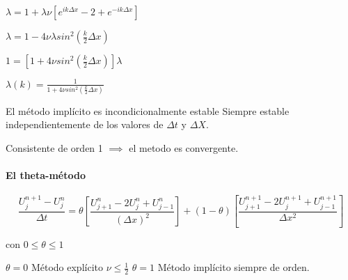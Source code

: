 $\lambda =  1+\lambda \nu\left[e^{ik\Delta x} - 2 + e^{-ik\Delta x}\right]$

$\lambda = 1-4\nu\lambda sin^2(\frac{k}{2}\Delta x)$

$1 = [1+4\nu sin^2(\frac{k}{2}\Delta x)]\lambda$

$\lambda(k) = \frac{1}{1+4\nu sin^2(\frac{k}{2}\Delta x)}$


El método implícito es incondicionalmente estable
Siempre estable independientemente de los valores de $\Delta t$ y $\Delta X$.

Consistente de orden 1 $\implies$ el metodo es convergente.

\paragraph{El theta-método}

$$\frac{U_j^{n+1}-U_j^n}{\Delta t} = 
\theta \left[ \frac{U_{j+1}^n-2U_j^n+U_{j-1}^n}{(\Delta x)^2}\right] +
(1-\theta)\left[\frac{U_{j+1}^{n+1}-2U_{j}^{n+1}+U_{j-1}^{n+1}}{\Delta x^2}\right]$$

con $0\le\theta\le 1$

$\theta = 0$ Método explícito $\nu \le \frac{1}{2}$
$\theta = 1$ Método implícito siempre de orden.
